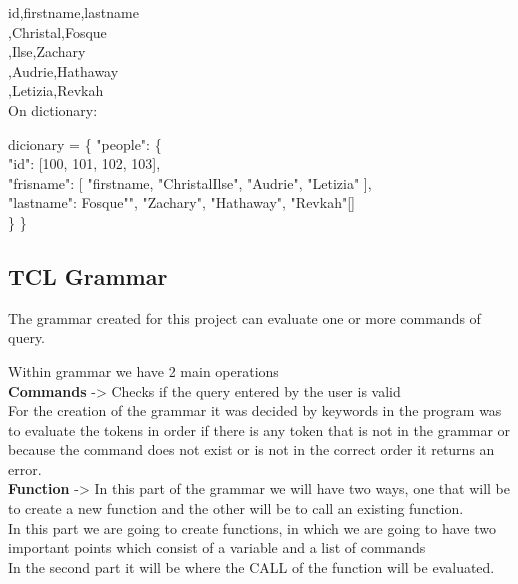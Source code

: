 \documentclass{article}
\begin{document}
\noindent
id,firstname,lastname  \\
,Christal,Fosque  \\
,Ilse,Zachary\\
,Audrie,Hathaway\\
,Letizia,Revkah\\

\vspace{1.0cm}
\noindent
On dictionary:

\noindent
dicionary = \{   "people": \{ \\
        					"id": [100, 101, 102, 103],\\
        					"frisname": [ "firstname, "ChristalIlse", "Audrie", "Letizia" ],\\
        					"lastname": Fosque"", "Zachary", "Hathaway", "Revkah"[]\\
        				\}	\}
		
        
\clearpage

\Large

\begin{center}
\section{TCL Grammar}
\end{center}

\setlength{\parindent}{10ex}
The grammar created for this project can evaluate one or more commands of query. \par
\noindent
Within grammar we have 2 main operations
\vspace{1.0cm}\\
\textbf{Commands} ->  Checks if the query entered by the user is valid\\
For the creation of the grammar it was decided by keywords in the program was to evaluate the tokens in order if there is any token that is not in the grammar or because the command does not exist or is not in the correct order it returns an error.
\vspace{1.0cm}\\
\textbf{Function} -> In this part of the grammar we will have two ways, one that will be to create a new function and the other will be to call an existing function.\\
In this part we are going to create functions, in which we are going to have two important points which consist of a variable and a list of commands\\
 In the second part it will be where the CALL of the function will be evaluated.
 
\end{document}
